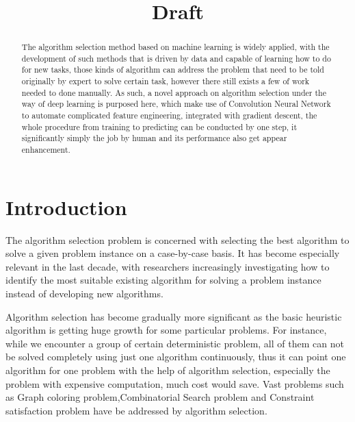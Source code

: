 \documentclass{article}
\title{Draft}
\begin{document}
\begin{abstract}
    The algorithm selection method based on machine learning is widely applied, with the development of such methods that is driven by data and capable of learning how to do for new tasks, those kinds of algorithm can address the problem that need to be told originally by expert to solve certain task, however there still exists a few of work needed to done manually. As such, a novel approach on algorithm selection under the way of deep learning is purposed here, which make use of Convolution Neural Network to automate complicated feature engineering, integrated with gradient descent, the whole procedure from training to predicting can be conducted by one step, it significantly simply the job by human and its performance also get appear enhancement.
\end{abstract}

\section{Introduction}
    The algorithm selection problem\cite{rice1976algorithm} is concerned with selecting the best algorithm to solve a given problem instance on a case-by-case basis. It has become especially relevant in the last decade, with researchers increasingly investigating how to identify the most suitable existing algorithm for solving a problem instance instead of developing new algorithms\cite{kotthoff2016algorithm}.
    
    Algorithm selection has become gradually more significant as the basic heuristic algorithm is getting huge growth for some particular problems. For instance, while we encounter a group of certain deterministic problem, all of them can not be solved completely using just one algorithm continuously, thus it can point one algorithm for one problem with the help of algorithm selection, especially the problem with expensive computation, much cost would save. Vast problems such as Graph coloring problem\cite{leighton1979graph,galinier1999hybrid},Combinatorial Search problem\cite{kotthoff2016algorithm} and Constraint satisfaction problem\cite{smith2009cross} have be addressed by algorithm selection.
    
\end{document}
